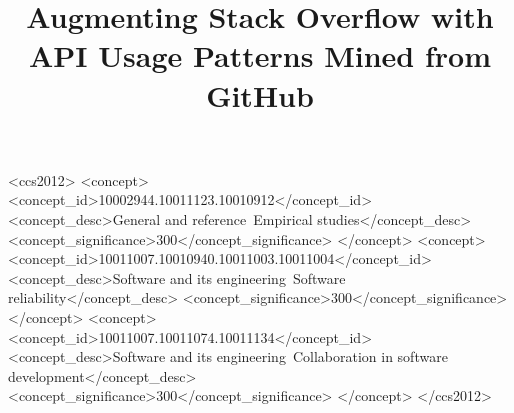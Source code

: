 \documentclass[sigconf]{acmart}
\begin{document}
\title{Augmenting Stack Overflow with API Usage Patterns Mined from GitHub}




\begin{CCSXML}
<ccs2012>
<concept>
<concept_id>10002944.10011123.10010912</concept_id>
<concept_desc>General and reference~Empirical studies</concept_desc>
<concept_significance>300</concept_significance>
</concept>
<concept>
<concept_id>10011007.10010940.10011003.10011004</concept_id>
<concept_desc>Software and its engineering~Software reliability</concept_desc>
<concept_significance>300</concept_significance>
</concept>
<concept>
<concept_id>10011007.10011074.10011134</concept_id>
<concept_desc>Software and its engineering~Collaboration in software development</concept_desc>
<concept_significance>300</concept_significance>
</concept>
</ccs2012>
\end{CCSXML}



\maketitle












\balance


\end{document}
